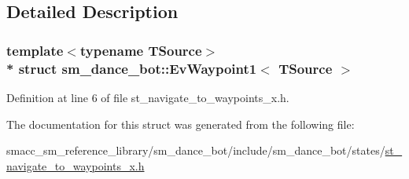 \subsection{Detailed Description}
\subsubsection*{template$<$typename T\+Source$>$\\*
struct sm\+\_\+dance\+\_\+bot\+::\+Ev\+Waypoint1$<$ T\+Source $>$}



Definition at line 6 of file st\+\_\+navigate\+\_\+to\+\_\+waypoints\+\_\+x.\+h.



The documentation for this struct was generated from the following file\+:\begin{DoxyCompactItemize}
\item 
smacc\+\_\+sm\+\_\+reference\+\_\+library/sm\+\_\+dance\+\_\+bot/include/sm\+\_\+dance\+\_\+bot/states/\hyperlink{st__navigate__to__waypoints__x_8h}{st\+\_\+navigate\+\_\+to\+\_\+waypoints\+\_\+x.\+h}\end{DoxyCompactItemize}
